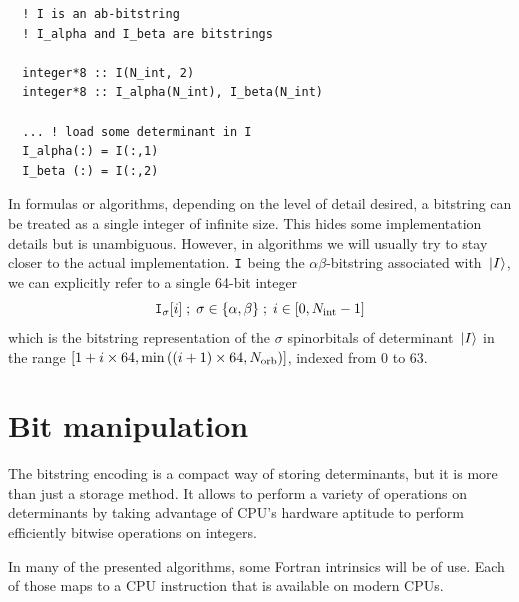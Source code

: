 \documentclass[./thesis.tex]{subfiles}
\begin{document}
\lstset{frame=single}
\begin{lstlisting}
  ! I is an ab-bitstring
  ! I_alpha and I_beta are bitstrings
  
  integer*8 :: I(N_int, 2)
  integer*8 :: I_alpha(N_int), I_beta(N_int)

  ... ! load some determinant in I
  I_alpha(:) = I(:,1)
  I_beta (:) = I(:,2)
\end{lstlisting}
\lstset{frame=none}


In formulas or algorithms, depending on the level of detail desired, a bitstring can be treated as a single integer of infinite size. This hides some implementation details but is unambiguous. However, in algorithms we will usually try to stay closer to the actual implementation. ${\texttt{I}}$ being the $\alpha \beta$-bitstring associated with ${\ket*{I}}$, we can explicitly refer to a single 64-bit integer
$${\texttt{I}}_{\sigma}[i]\; ;\; \sigma \in \{\alpha, \beta\}\; ;\; i \in [0, {N_\text{int}}-1]$$
which is the bitstring representation of the $\sigma$ spinorbitals of determinant ${\ket*{I}}$ in the range $[1+i \times 64, \min \left( (i+1) \times 64, {N_\text{orb}} \right)]$, indexed from $0$ to $63$.

      
\section{Bit manipulation}

The bitstring encoding is a compact way of storing determinants, but it is more than just a storage method. It allows to perform a variety of operations on determinants by taking advantage of CPU's hardware aptitude to perform efficiently bitwise operations on integers.

In many of the presented algorithms, some Fortran intrinsics will be of use. Each of those maps to a CPU instruction that is available on modern CPUs.
\end{document}

